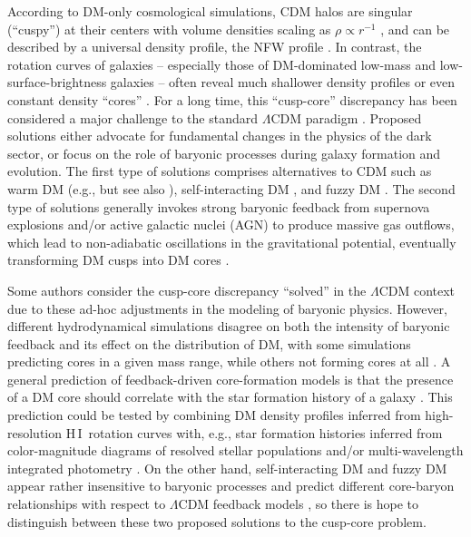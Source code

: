 \documentclass[a4paper,11pt]{article}
\newcommand{\hi } {{\rm H}\,{\small\rm I}}
\begin{document}
According to DM-only cosmological simulations, CDM halos are singular (``cuspy'') at their centers with volume densities scaling as $\rho\propto r^{-1}$ \citep{Dubinski1991, Warren1992}, and can be described by a universal density profile, the NFW profile \citep{Navarro1996}. In contrast, the rotation curves of galaxies -- especially those of DM-dominated low-mass and low-surface-brightness galaxies -- often reveal much shallower density profiles or even constant density ``cores'' \citep[see][for a review]{deBlok2010}. For a long time, this ``cusp-core'' discrepancy has been considered a major challenge to the standard $\Lambda$CDM paradigm \citep[see][for a review]{Bullock2017}. Proposed solutions either advocate for fundamental changes in the physics of the dark sector, or focus on the role of baryonic processes during galaxy formation and evolution. The first type of solutions comprises alternatives to CDM such as warm DM (e.g., \citealt{Colin2000} but see also \citealt{Maccio2012}), self-interacting DM \citep[e.g.,][]{Spergel2000}, and fuzzy DM \citep[e.g.,][]{Goodman2000, Hu2000}. The second type of solutions generally invokes strong baryonic feedback from supernova explosions and/or active galactic nuclei (AGN) to produce massive gas outflows, which lead to non-adiabatic oscillations in the gravitational potential, eventually transforming DM cusps into DM cores \citep[e.g.,][]{Governato2010, Governato2012, Pontzen2012, El-Zant2016, Freundlich2020a}.

Some authors consider the cusp-core discrepancy ``solved'' in the $\Lambda$CDM context due to these ad-hoc adjustments in the modeling of baryonic physics. However, different hydrodynamical simulations disagree on both the intensity of baryonic feedback and its effect on the distribution of DM, with some simulations predicting cores in a given mass range, while others not forming cores at all \citep[e.g.,][]{Bose2019}. A general prediction of feedback-driven core-formation models is that the presence of a DM core should correlate with the star formation history of a galaxy \citep[e.g.][]{Muni2025}. This prediction could be tested by combining DM density profiles inferred from high-resolution \hi\ rotation curves with, e.g., star formation histories inferred from color-magnitude diagrams of resolved stellar populations \citep[e.g.,][]{McQuinn2010a} and/or multi-wavelength integrated photometry \citep[e.g.,][]{Schombert2019}. On the other hand, self-interacting DM and fuzzy DM appear rather insensitive to baryonic processes \citep{Robles2017} and predict different core-baryon relationships with respect to $\Lambda$CDM feedback models \citep{Jiang2023}, so there is hope to distinguish between these two proposed solutions to the cusp-core problem.
\end{document}

